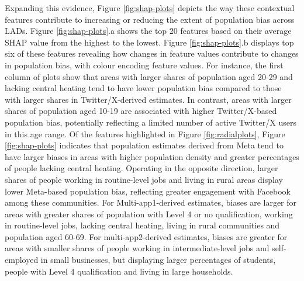 \documentclass[]{rsos}%
\begin{document}
Expanding this evidence, Figure \ref{fig:shap-plots} depicts the way
these contextual features contribute to increasing or reducing the
extent of population bias across LADs. Figure \ref{fig:shap-plots}.a
shows the top 20 features based on their average SHAP value from the
highest to the lowest. Figure \ref{fig:shap-plots}.b displays top six of
these features revealing how changes in feature values contribute to
changes in population bias, with colour encoding feature values. For
instance, the first column of plots show that areas with larger shares
of population aged 20-29 and lacking central heating tend to have lower
population bias compared to those with larger shares in
Twitter/X-derived estimates. In contrast, areas with larger shares of
population aged 10-19 are associated with higher Twitter/X-based
population bias, potentially reflecting a limited number of active
Twitter/X users in this age range. Of the features highlighted in Figure
\ref{fig:radialplots}, Figure \ref{fig:shap-plots} indicates that
population estimates derived from Meta tend to have larger biases in
areas with higher population density and greater percentages of people
lacking central heating. Operating in the opposite direction, larger
shares of people working in routine-level jobs and living in rural areas
display lower Meta-based population bias, reflecting greater engagement
with Facebook among these communities. For Multi-app1-derived estimates,
biases are larger for areas with greater shares of population with Level
4 or no qualification, working in routine-level jobs, lacking central
heating, living in rural communities and population aged 60-69. For
multi-app2-derived estimates, biases are greater for areas with smaller
shares of people working in intermediate-level jobs and self-employed in
small businesses, but displaying larger percentages of students, people
with Level 4 qualification and living in large households.
\end{document}
